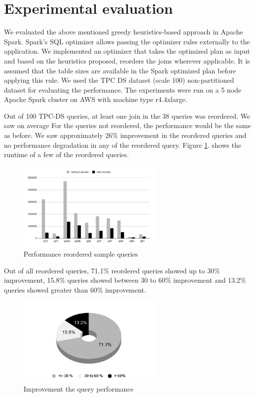\section{Experimental evaluation}
We evaluated the above mentioned greedy heuristics-based approach in Apache Spark. Spark's SQL optimizer allows passing the optimizer rules externally to the application. We implemented an optimizer that takes the optimized plan as input and based on the heuristics proposed, reorders the joins wherever applicable. It is assumed that the table sizes are available in the Spark optimized plan before applying this rule. We used the TPC DS dataset (scale 100) non-partitioned dataset for evaluating the performance. The experiments were run on a 5 node Apache Spark cluster on AWS with machine type r4.4xlarge.

Out of 100 TPC-DS queries, at least one join in the 38 queries was reordered. We saw on average  For the queries not reordered, the performance would be the same as before. We saw approximately 26\% improvement in the reordered queries and no performance degradation in any of the reordered query. Figure \ref{performance_number}. shows the runtime of a few of the reordered queries.

\begin{figure}[ht]
    \centerline{\includegraphics[width=7cm]{fig/chart.png}}
    \caption{Performance reordered sample queries}
    \label{performance_number}
\end{figure}

Out of all reordered queries, 71.1\% reordered queries showed up to 30\% improvement, 15.8\% queries showed between 30 to 60\% improvement and 13.2\% queries showed greater than 60\% improvement.

\begin{figure}[ht]
\centerline{\includegraphics[width=7cm]{fig/pie.png}}
\caption{Improvement the query performance}
\label{performance_pie_chart}
\end{figure}

